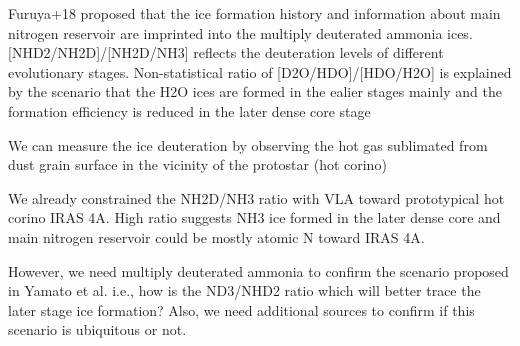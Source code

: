 \documentclass[12pt,a4paper]{article}  %
\begin{document}
Furuya+18 proposed that the ice formation history and information about main nitrogen reservoir are imprinted into the multiply deuterated ammonia ices. [NHD2/NH2D]/[NH2D/NH3] reflects the deuteration levels of different evolutionary stages. Non-statistical ratio of [D2O/HDO]/[HDO/H2O] is explained by the scenario that the H2O ices are formed in the ealier stages mainly and the formation efficiency is reduced in the later dense core stage

We can measure the ice deuteration by observing the hot gas sublimated from dust grain surface in the vicinity of the protostar (hot corino)

We already constrained the NH2D/NH3 ratio with VLA toward prototypical hot corino IRAS 4A. High ratio suggests NH3 ice formed in the later dense core and main nitrogen reservoir could be mostly atomic N toward IRAS 4A. 

However, we need multiply deuterated ammonia to confirm the scenario proposed in Yamato et al. i.e., how is the ND3/NHD2 ratio which will better trace the later stage ice formation? Also, we need additional sources to confirm if this scenario is ubiquitous or not.

\color{black}



%
%
 

%
\end{document}
